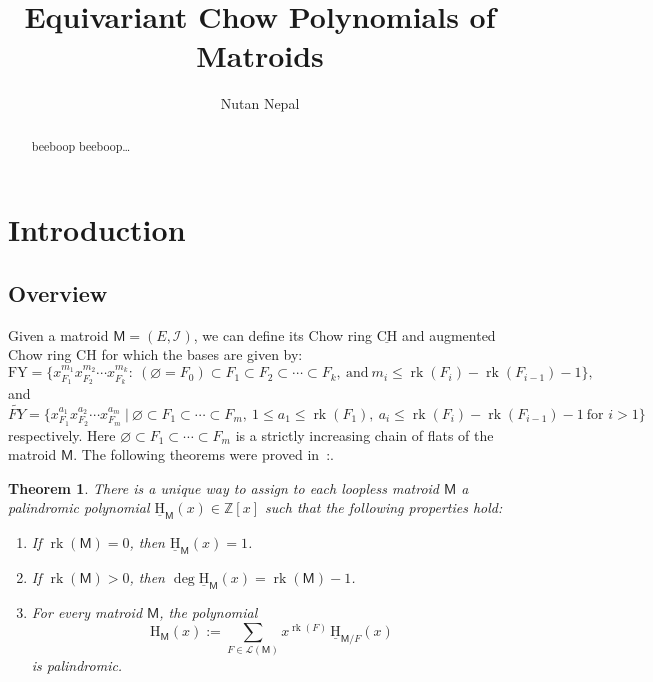 \documentclass[10pt, a4paper, english]{amsart}
\title[Equivariant Chow Polynomials of Matroids]{Equivariant Chow Polynomials of Matroids}
\author[N. Nepal]{Nutan Nepal}
\theoremstyle{teoremas}
\newtheorem{theorem}{Theorem}[section]
\theoremstyle{definition}
\DeclareMathOperator{\rk}{rk}
\newcommand{\M}{\mathsf{M}}
\newcommand{\cI}{\mathcal{I}}
\newcommand{\Z}{\mathbb{Z}}
\newcommand{\rank}{\operatorname{rk}}
\renewcommand{\H}{\mathrm{H}}
\newcommand{\CH}{\mathrm{CH}}
\newcommand{\uH}{\underline{\mathrm{H}}}
\newcommand{\uCH}{\underline{\mathrm{CH}}}
\begin{document}
\begin{abstract}
    beeboop beeboop\dots
\end{abstract}

\maketitle

\section{Introduction}\label{sec:introduction}

\subsection{Overview}
Given a matroid $\M = (E, \cI)$, we can define its Chow ring $\uCH$ and augmented Chow ring $\CH$ for which the bases are given by:
    $$\text{FY}=\{x_{F_1}^{m_1}x_{F_2}^{m_2}\cdots x_{F_k}^{m_k}:\ (\varnothing = F_0)\subset
        F_1\subset F_2\subset\cdots\subset
        F_k,\ \text{and}\ m_i\leq\rank(F_i)-\rank(F_{i-1})-1 \},$$
and
    $$\widetilde{FY} = \{x_{F_1}^{a_1}x_{F_2}^{a_2}\cdots x_{F_m}^{a_m}\ 
    |\ \varnothing\subset F_1\subset\cdots\subset F_m,\ 1\leq a_1\leq \rank(F_1)
    ,\ a_i\leq\rank(F_i)-\rank(F_{i-1})-1\ \text{for } i>1\}$$
respectively. Here $\varnothing\subset F_1\subset\cdots\subset F_m$ is a strictly increasing chain of flats of the matroid $\M$.
The following theorems were proved in~\cite{fmsv24}:.

\begin{theorem}\label{thm:fmsv-main-recursion-defi-H-and-uH}
    There is a unique way to assign to each loopless matroid $\M$ a palindromic polynomial $\uH_{\M}(x) \in \Z[x]$ such that the following properties hold:
    \begin{enumerate}[\normalfont(i)]
        \item If $\rk(\M) = 0$, then $\uH_{\M}(x) = 1$.\label{it:fmsv-mainfirst}\
        \item If $\rk(\M) > 0$, then $\deg \uH_{\M}(x) = \rk(\M) - 1$.\label{it:fmsv-mainsecond}
        \item For every matroid $\M$, the polynomial
            \[ \H_{\M}(x) := \sum_{F\in \mathcal{L}(\M)} x^{\rk(F)}\, \uH_{\M/F}(x)\]
        is palindromic.\label{it:fmsv-mainthird}
    \end{enumerate}
\end{theorem}
\end{document}
